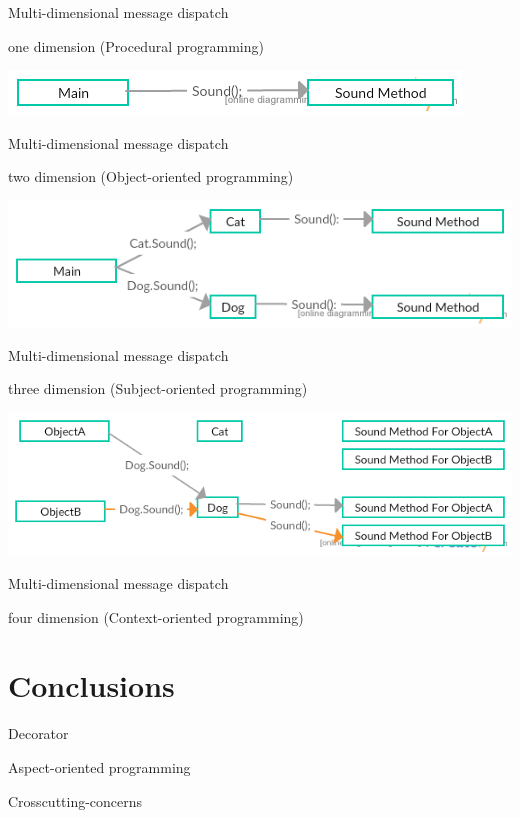 \documentclass[presentation]{beamer}
\begin{document}
\begin{frame}[label={sec:org542f3c3}]{Multi-dimensional message dispatch}
\begin{block}{one dimension (Procedural programming)}
\begin{center}
\includegraphics[width=.9\linewidth]{./one.jpg}
\end{center}
\end{block}
\end{frame}

\begin{frame}[label={sec:orgeccb0c2}]{Multi-dimensional message dispatch}
\begin{block}{two dimension (Object-oriented programming)}
\begin{center}
\includegraphics[width=.9\linewidth]{./two.png}
\end{center}
\end{block}
\end{frame}


\begin{frame}[label={sec:org6208b74}]{Multi-dimensional message dispatch}
\begin{block}{three dimension (Subject-oriented programming)}
\begin{center}
\includegraphics[width=.9\linewidth]{./three.png}
\end{center}
\end{block}
\end{frame}

\begin{frame}[fragile,label={sec:org37669ea}]{Multi-dimensional message dispatch}
 \begin{block}{four dimension (Context-oriented programming)}

\end{block}
\end{frame}

\section{Conclusions}
\label{sec:org9c2276e}

\begin{frame}[label={sec:org460e995}]{Decorator}
\end{frame}
\begin{frame}[label={sec:orgf761adb}]{Aspect-oriented programming}
\end{frame}
\begin{frame}[label={sec:org9763a31}]{Crosscutting-concerns}
\end{frame}
\end{document}
